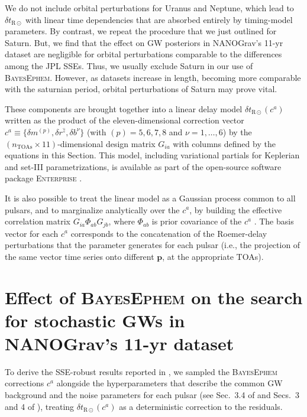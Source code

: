 \documentclass[iop,apj,twocolappendix]{emulateapj}
\begin{document}
\begin{itemize}
We do not include orbital perturbations for Uranus and Neptune, which lead to $\delta t_{\mathrm{R\odot}}$ with linear time dependencies that are absorbed entirely by timing-model parameters. By contrast, we repeat the procedure that we just outlined for Saturn. But, we find that the effect on GW posteriors in NANOGrav's 11-yr dataset are negligible for orbital perturbations comparable to the differences among the JPL SSEs. Thus, we usually exclude Saturn in our use of \textsc{BayesEphem}. However, as datasets increase in length, becoming more comparable with the saturnian period, orbital perturbations of Saturn may prove vital.
\end{itemize}

These components are brought together into a linear delay model $\delta t_{\mathrm{R}\odot}(c^a)$ written as the product of the eleven-dimensional correction vector $c^a \equiv \{\delta m^{(p)}, \delta r^{\hat{z}}, \delta b^\nu\}$ (with $(p) = 5,6,7,8$ and $\nu = 1, \ldots, 6$) by the $(n_\mathrm{TOAs} \times 11)$-dimensional design matrix $G_{i a}$ with columns defined by the equations in this Section. This model, including variational partials for Keplerian and set-III parametrizations, is available as part of the open-source software package \textsc{Enterprise} \citep{enterprise}.

It is also possible to treat the linear model as a Gaussian process common to all pulsars, and to marginalize analytically over the $c^a$, by building the effective correlation matrix $G_{i a} \Phi_{ab} G_{j b}$, where $\Phi_{ab}$ is prior covariance of the $c^a$ \citep{vhv14}. The basis vector for each $c^a$ corresponds to the concatenation of the Roemer-delay perturbations that the parameter generates for each pulsar (i.e., the projection of the same vector time series onto different $\mathbf{p}$, at the appropriate TOAs).

\section{Effect of \textsc{BayesEphem} on the search for stochastic GWs in NANOGrav's 11-yr dataset}
\label{sec:results}

To derive the SSE-robust results reported in \cite{2018ApJ...859...47A}, we sampled the \textsc{BayesEphem} corrections $c^a$ alongside the hyperparameters that describe the common GW background and the noise parameters for each pulsar (see Sec.\ 3.4 of \citealt{2018ApJ...859...47A} and Secs.\ 3 and 4 of \citealt{2016ApJ...821...13A}), treating $\delta t_{\mathrm{R}\odot}(c^a)$ as a deterministic correction to the residuals.
\end{document}
